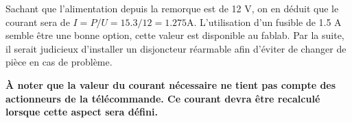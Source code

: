 Sachant que l'alimentation depuis la remorque est de 12 \si{\volt}, on en déduit que le courant sera de \(I = P/U = 15.3/12 = 1.275 \si{\ampere} \).
L'utilisation d'un fusible de 1.5 \si{\ampere} semble être une bonne option, cette valeur est disponible au \gls{fablab}. Par la suite, il serait judicieux
d'installer un disjoncteur réarmable afin d'éviter de changer de pièce en cas de problème.

\textbf{À noter que la valeur du courant nécessaire ne tient pas compte des actionneurs de la télécommande. Ce courant devra être recalculé lorsque
    cette aspect sera défini.}